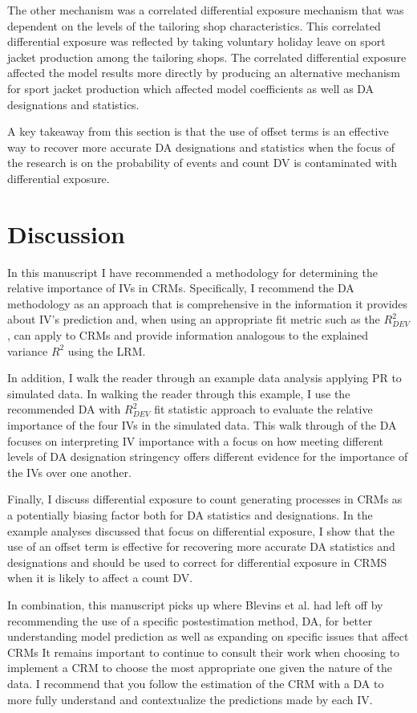 \documentclass[ShortAfour,times,sageapa]{sagej}
\begin{document}
	The other mechanism was a correlated differential exposure mechanism that was dependent on the levels of the tailoring shop characteristics.
	This correlated differential exposure was reflected by taking voluntary holiday leave on sport jacket production among the tailoring shops.
	The correlated differential exposure affected the model results more directly by producing an alternative mechanism for sport jacket production which affected model coefficients as well as DA designations and statistics.
	
	A key takeaway from this section is that the use of offset terms is an effective way to recover more accurate DA designations and statistics when the focus of the research is on the probability of events and count DV is contaminated with differential exposure.

	
\section{Discussion}

	In this manuscript I have recommended a methodology for determining the relative importance of IVs in CRMs.
	Specifically, I recommend the DA methodology as an approach that is comprehensive in the information it provides about IV's prediction and, when using an appropriate fit metric such as the $R^2_{DEV}$, can apply to CRMs and provide information analogous to the explained variance $R^2$ using the LRM.
	
	In addition, I walk the reader through an example data analysis applying PR to simulated data. 
	In walking the reader through this example, I use the recommended DA with $R^2_{DEV}$ fit statistic approach to evaluate the relative importance of the four IVs in the simulated data.
	This walk through of the DA focuses on interpreting IV importance with a focus on how meeting different levels of DA designation stringency offers different evidence for the importance of the IVs over one another.
	
	Finally, I discuss differential exposure to count generating processes in CRMs as a potentially biasing factor both for DA statistics and designations.
	In the example analyses discussed that focus on differential exposure, I show that the use of an offset term is effective for recovering more accurate DA statistics and designations and should be used to correct for differential exposure in CRMS when it is likely to affect a count DV.
	
	In combination, this manuscript picks up where Blevins et al. \citeyear{blevins2015count} had left off by recommending the use of a specific postestimation method, DA, for better understanding model prediction as well as expanding on specific issues that affect CRMs
	It remains important to continue to consult their work when choosing to implement a CRM to choose the most appropriate one given the nature of the data.
	I recommend that you follow the estimation of the CRM with a DA to more fully understand and contextualize the predictions made by each IV.
	
\end{document}

